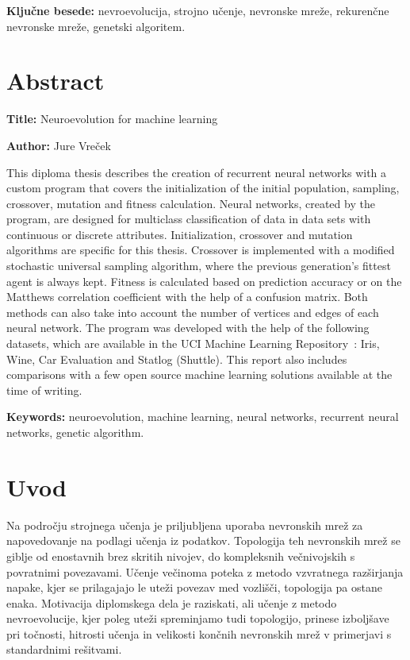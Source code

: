 \documentclass[a4paper,12pt,openright]{book}
\newcommand{\ttitleEn}{Neuroevolution for machine learning}
\newcommand{\tauthor}{Jure Vreček}
\newcommand{\tkeywords}{nevroevolucija, strojno učenje, nevronske mreže, rekurenčne nevronske mreže, genetski algoritem}
\newcommand{\tkeywordsEn}{neuroevolution, machine learning, neural networks, recurrent neural networks, genetic algorithm}
\newcommand{\clearemptydoublepage}{\newpage{\pagestyle{empty}\cleardoublepage}}
\begin{document}
    \bigskip

    \noindent\textbf{Ključne besede:} \tkeywords.
    \clearemptydoublepage

    \chapter*{Abstract}

    \noindent\textbf{Title:} \ttitleEn
    \bigskip

    \noindent\textbf{Author:} \tauthor
    \bigskip

    \noindent This diploma thesis describes the creation of recurrent neural networks with a custom program that covers the
    initialization of the initial population, sampling, crossover, mutation and fitness calculation.
    Neural networks, created by the program, are designed for multiclass classification of data in data sets with continuous or discrete attributes.
    Initialization, crossover and mutation algorithms are specific for this thesis.
    Crossover is implemented with a modified stochastic universal sampling algorithm, where the previous generation's fittest agent is always kept.
    Fitness is calculated based on prediction accuracy or on the Matthews correlation coefficient with the help of a confusion matrix.
    Both methods can also take into account the number of vertices and edges of each neural network.
    The program was developed with the help of the following datasets, which are available in the UCI Machine Learning Repository~\cite{Dua:2019}:
    Iris, Wine, Car Evaluation and Statlog (Shuttle).
    This report also includes comparisons with a few open source machine learning solutions available at the time of writing.
    \bigskip

    \noindent\textbf{Keywords:} \tkeywordsEn.
    \clearemptydoublepage

    \mainmatter
    \setcounter{page}{1}
    \pagestyle{fancy}

    \chapter{Uvod}\label{ch:uvod}
    Na področju strojnega učenja je priljubljena
    uporaba nevronskih mrež za napovedovanje na podlagi učenja iz podatkov.
    Topologija teh nevronskih mrež se giblje od enostavnih brez skritih nivojev, do kompleksnih večnivojskih
    s povratnimi povezavami.
    Učenje večinoma poteka z metodo vzvratnega razširjanja napake, kjer se prilagajajo le uteži povezav med vozlišči,
    topologija pa ostane enaka.
    Motivacija diplomskega dela je raziskati, ali učenje z metodo nevroevolucije, kjer poleg uteži spreminjamo tudi topologijo,
    prinese izboljšave pri točnosti, hitrosti učenja in velikosti končnih nevronskih
    mrež v primerjavi s standardnimi rešitvami.
\end{document}

